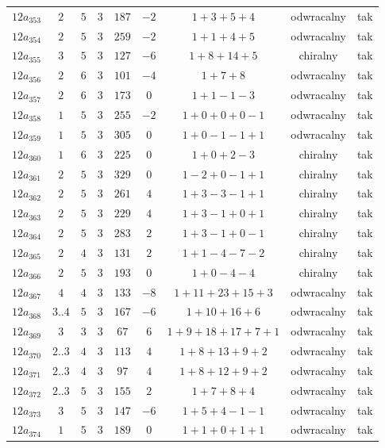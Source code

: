 \begin{longtable}{ccccccccc}
$12a_{353}$ & $2$ & $5$ & $3$ & $187$ & $-2$ & $1+3+5+4$ & odwracalny & tak \\
$12a_{354}$ & $2$ & $5$ & $3$ & $259$ & $-2$ & $1+1+4+5$ & odwracalny & tak \\
$12a_{355}$ & $3$ & $5$ & $3$ & $127$ & $-6$ & $1+8+14+5$ & chiralny & tak \\
$12a_{356}$ & $2$ & $6$ & $3$ & $101$ & $-4$ & $1+7+8$ & odwracalny & tak \\
$12a_{357}$ & $2$ & $6$ & $3$ & $173$ & $0$ & $1+1-1-3$ & odwracalny & tak \\
$12a_{358}$ & $1$ & $5$ & $3$ & $255$ & $-2$ & $1+0+0+0-1$ & odwracalny & tak \\
$12a_{359}$ & $1$ & $5$ & $3$ & $305$ & $0$ & $1+0-1-1+1$ & odwracalny & tak \\
$12a_{360}$ & $1$ & $6$ & $3$ & $225$ & $0$ & $1+0+2-3$ & chiralny & tak \\
$12a_{361}$ & $2$ & $5$ & $3$ & $329$ & $0$ & $1-2+0-1+1$ & chiralny & tak \\
$12a_{362}$ & $2$ & $5$ & $3$ & $261$ & $4$ & $1+3-3-1+1$ & chiralny & tak \\
$12a_{363}$ & $2$ & $5$ & $3$ & $229$ & $4$ & $1+3-1+0+1$ & chiralny & tak \\
$12a_{364}$ & $2$ & $5$ & $3$ & $283$ & $2$ & $1+3-1+0-1$ & chiralny & tak \\
$12a_{365}$ & $2$ & $4$ & $3$ & $131$ & $2$ & $1+1-4-7-2$ & chiralny & tak \\
$12a_{366}$ & $2$ & $5$ & $3$ & $193$ & $0$ & $1+0-4-4$ & chiralny & tak \\
$12a_{367}$ & $4$ & $4$ & $3$ & $133$ & $-8$ & $1+11+23+15+3$ & odwracalny & tak \\
$12a_{368}$ & $3..4$ & $5$ & $3$ & $167$ & $-6$ & $1+10+16+6$ & odwracalny & tak \\
$12a_{369}$ & $3$ & $3$ & $3$ & $67$ & $6$ & $1+9+18+17+7+1$ & odwracalny & tak \\
$12a_{370}$ & $2..3$ & $4$ & $3$ & $113$ & $4$ & $1+8+13+9+2$ & odwracalny & tak \\
$12a_{371}$ & $2..3$ & $4$ & $3$ & $97$ & $4$ & $1+8+12+9+2$ & odwracalny & tak \\
$12a_{372}$ & $2..3$ & $5$ & $3$ & $155$ & $2$ & $1+7+8+4$ & odwracalny & tak \\
$12a_{373}$ & $3$ & $5$ & $3$ & $147$ & $-6$ & $1+5+4-1-1$ & odwracalny & tak \\
$12a_{374}$ & $1$ & $5$ & $3$ & $189$ & $0$ & $1+1+0+1+1$ & odwracalny & tak \\

\end{longtable}
